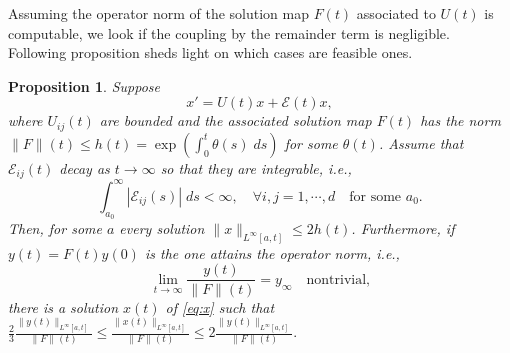 \documentclass[a4paper,11pt]{article}
\newtheorem{proposition}{Proposition}[section]
\theoremstyle{remark}
\begin{document}
Assuming the operator norm of the solution map $F(t)$ associated to $U(t)$ is computable, we look if the coupling by the remainder term is negligible. Following proposition sheds light on which cases are feasible ones.
\begin{proposition} \label{prop:stab}
 Suppose
 \begin{equation}
x' = U(t)x + \mathcal{E}(t)x, \label{eq:x}
 \end{equation}
where $U_{ij}(t)$ are bounded and the associated solution map $F(t)$ has the norm $\|F\|(t) \le h(t)=\exp\left(\int_0^t \theta(s)\; ds\right)$ for some $\theta(t)$. Assume that $\mathcal{E}_{ij}(t)$ decay as $t \rightarrow \infty$ so that they are integrable, i.e.,
 $$ \int_{a_0}^\infty |\mathcal{E}_{ij}(s)| \; ds < \infty, \quad \forall i,j=1,\cdots,d \quad \text{for some $a_0$.}$$
 Then, for some $a$ every solution $\|x\|_{L^\infty[a,t]} \le 2h(t)$. Furthermore, if $y(t)=F(t)y(0)$ is the one attains the operator norm, i.e.,
 $$ \lim_{t \rightarrow \infty}\frac{y(t)}{\|F\|(t)} = y_\infty \quad \text{nontrivial,}$$
 there is a solution $x(t)$ of \eqref{eq:x} such that $\displaystyle \frac{2}{3}\frac{\|y(t)\|_{L^\infty[a,t]}}{\|F\|(t)}\le\frac{\|x(t)\|_{L^\infty[a,t]}}{\|F\|(t)} \le 2\frac{\|y(t)\|_{L^\infty[a,t]}}{\|F\|(t)}.$
\end{proposition}
\end{document}
